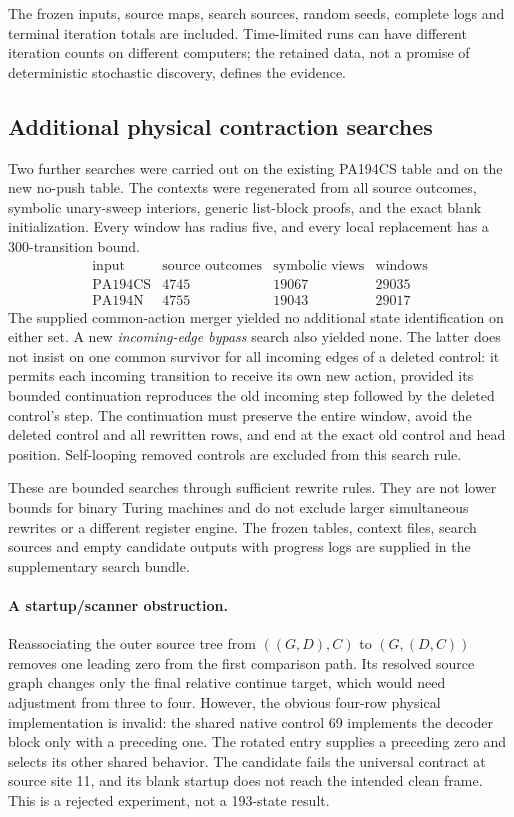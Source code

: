 The frozen inputs, source maps, search sources, random seeds, complete logs
and terminal iteration totals are included. Time-limited runs can have
different iteration counts on different computers; the retained data,
not a promise of deterministic stochastic discovery, defines the evidence.
\subsection{Additional physical contraction searches}
Two further searches were carried out on the existing PA194CS table and
on the new no-push table. The contexts were regenerated from all source
outcomes, symbolic unary-sweep interiors, generic list-block proofs, and
the exact blank initialization. Every window has radius five, and every
local replacement has a 300-transition bound.
\[
\begin{array}{lrrr}
\text{input}&\text{source outcomes}&\text{symbolic views}&\text{windows}\\\hline
\text{PA194CS}&4745&19067&29035\\
\text{PA194N}&4755&19043&29017
\end{array}
\]
The supplied common-action merger yielded no additional state
identification on either set. A new \emph{incoming-edge bypass} search also
yielded none. The latter does not insist on one common survivor for all
incoming edges of a deleted control: it permits each incoming transition
to receive its own new action, provided its bounded continuation reproduces
the old incoming step followed by the deleted control's step. The continuation
must preserve the entire window, avoid the deleted control and all rewritten
rows, and end at the exact old control and head position. Self-looping
removed controls are excluded from this search rule.

These are bounded searches through sufficient rewrite rules. They are not
lower bounds for binary Turing machines and do not exclude larger simultaneous
rewrites or a different register engine. The frozen tables, context files,
search sources and empty candidate outputs with progress logs are supplied
in the supplementary search bundle.

\paragraph{A startup/scanner obstruction.}
Reassociating the outer source tree from
$((G,D),C)$ to $(G,(D,C))$ removes one leading zero from the first
comparison path. Its resolved source graph changes only the final
relative continue target, which would need adjustment from three to four.
However, the obvious four-row physical implementation is invalid: the
shared native control 69 implements the decoder block only with a
preceding one. The rotated entry supplies a preceding zero and selects
its other shared behavior. The candidate fails the universal contract at
source site 11, and its blank startup does not reach the intended clean
frame. This is a rejected experiment, not a 193-state result.

